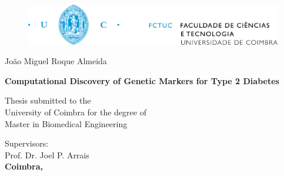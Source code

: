
%

\begin{titlepage}
	
	\centering
	
	\begin{figure}[H]
		\centering
		\includegraphics[width=\linewidth]{../images/title_page/fctuc.jpg}
	\end{figure}
	
	\vspace{90pt}
	{\LARGE João Miguel Roque Almeida}
	
	\vspace{90pt}
	{\huge \bf{Computational Discovery of Genetic Markers for Type 2 Diabetes}}
	
	\vspace{45pt}
	{\small Thesis submitted to the \\ University of Coimbra for the degree of \\ Master in Biomedical Engineering}
	
	\vspace{50pt}
	Supervisors: \\
	Prof. Dr. Joel P. Arrais \\

	
	
	
	\vfill
	{\Large \bf{Coimbra, \the\year}}
	
\end{titlepage}
